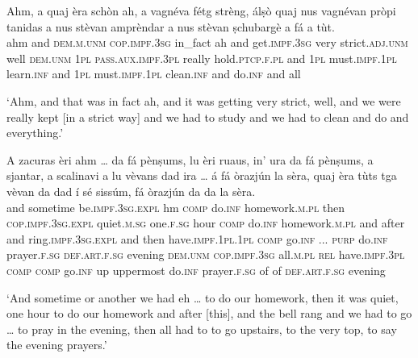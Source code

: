 \begin{linenumbers}
\gll    Ahm, a quaj èra schòn ah, a vagnéva fétg strèng, álṣò quaj nus vagnévan pròpi tanidas a nus stèvan amprèndar a nus stèvan ṣchubargè a fá a tùt.\\
ahm and \textsc{dem.m.unm} \textsc{cop.impf.3sg} in\_fact ah and get.\textsc{impf.3sg} very strict.\textsc{adj.unm} well \textsc{dem.unm} \textsc{1pl} \textsc{pass.aux.impf.3pl} really hold.\textsc{ptcp.f.pl} and \textsc{1pl} must.\textsc{impf.1pl} learn.\textsc{inf} and \textsc{1pl}  must.\textsc{impf.1pl} clean.\textsc{inf} and do.\textsc{inf} and all\\
\end{linenumbers}
\medskip
\glt `Ahm, and that was in fact ah, and it was getting very strict, well, and we were really kept [in a strict way] and we had to study and we had to clean and do and everything.'
\medskip

\begin{linenumbers}
\gll A zacuras èri ahm …  da fá pènṣums, lu èri ruaus, in’ ura da  fá  pènṣums, a  sjantar, a scalinavi a  lu vèvans  dad ira  …  á  fá  òrazjún la sèra, quaj èra tùts tga vèvan da dad í sé sissúm, fá  òrazjún   da da la sèra.\\
 and sometime be.\textsc{impf.3sg.expl} hm {} \textsc{comp} do.\textsc{inf} homework.\textsc{m.pl} then \textsc{cop.impf.3sg.expl} quiet.\textsc{m.sg} one.\textsc{f.sg} hour \textsc{comp} do.\textsc{inf} homework.\textsc{m.pl} and after and   ring.\textsc{impf.3sg.expl} and then have.\textsc{impf.1pl.1pl} \textsc{comp} go.\textsc{inf} ... \textsc{purp} do.\textsc{inf} prayer.\textsc{f.sg} \textsc{def.art.f.sg} evening \textsc{dem.unm} \textsc{cop.impf.3sg} all.\textsc{m.pl} \textsc{rel} have.\textsc{impf.3pl} \textsc{comp} \textsc{comp} go.\textsc{inf} up uppermost do.\textsc{inf} prayer.\textsc{f.sg} of of \textsc{def.art.f.sg} evening \\
\end{linenumbers}
\medskip
\glt `And sometime or another we had eh … to do our homework, then it was quiet, one hour to do our homework and after [this], and the bell rang and we had to go … to pray in the evening, then all had to to go upstairs, to the very top, to say the evening prayers.'
\medskip

